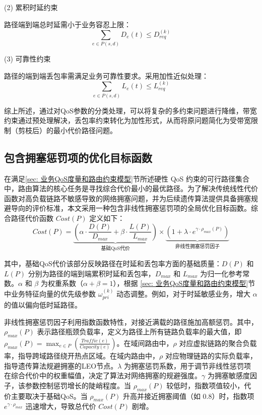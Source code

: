 \documentclass[print, master, vlined]{DissertUESTC}
\begin{document}
    (2) 累积时延约束
    
    路径端到端总时延需小于业务容忍上限：
    \begin{equation}
        \sum_{e \in P(s,d)} D_e(t) \le D_{req}^{(k)}
    \end{equation}
    
    (3) 可靠性约束
    
    路径的端到端丢包率需满足业务可靠性要求。采用加性近似处理：
    \begin{equation}
        \sum_{e \in P(s,d)} L_e(t) \le L_{req}^{(k)}
    \end{equation}
    
    综上所述，通过对QoS参数的分类处理，可以将复杂的多约束问题进行降维，带宽约束通过预处理解决，丢包率约束转化为加性形式，从而将原问题简化为受带宽限制（剪枝后）的最小代价路径问题。

    \subsection{包含拥塞惩罚项的优化目标函数}
    
    在满足\ref{sec: 业务QoS度量和路由约束模型}节所述硬性 QoS 约束的可行路径集合中，路由算法的核心任务是寻找综合代价最小的最优路径。为了解决传统线性代价函数对高负载链路不敏感导致的网络拥塞问题，并为后续遗传算法提供具备拥塞规避导向的评价标准，本文采用一种包含非线性拥塞惩罚项的全局优化目标函数。综合路径代价函数 $Cost(P)$ 定义如下：
    \begin{equation}
        Cost(P) = \underbrace{ \left( \alpha \cdot \frac{D(P)}{D_{max}} + \beta \cdot \frac{L(P)}{L_{max}} \right) }_{\text{基础QoS代价}} \times \underbrace{ \left( 1 + \lambda \cdot e^{\gamma \cdot \rho_{max}(P)} \right) }_{\text{非线性拥塞惩罚因子}}
    \end{equation}
    
    其中，基础QoS代价该部分反映路径在时延和丢包率方面的基础质量：$D(P)$ 和 $L(P)$ 分别为路径的端到端累积时延和丢包率，$D_{max}$ 和 $L_{max}$ 为归一化参考常数。$\alpha$ 和 $\beta$ 为权重系数（$\alpha + \beta = 1$），根据 \ref{sec: 业务QoS度量和路由约束模型}节中业务特征向量的优先级参数 $\omega_{pri}^{(k)}$ 动态调整。例如，对于时延敏感业务，增大 $\alpha$ 的值以偏向低时延路径。
    
    
    非线性拥塞惩罚因子利用指数函数特性，对接近满载的路径施加高额惩罚。其中，$\rho_{max}(P)$ 表示路径瓶颈负载率，定义为路径上所有链路负载率的最大值，即 $\rho_{max}(P) = \max_{e \in P} (\frac{Traffic(e)}{Capacity(e)})$。在域间路由中，$\rho$ 对应虚拟链路的聚合负载率，指导跨域路径绕开热点区域。在域内路由中，$\rho$ 对应物理链路的实际负载率，指导遗传算法规避拥塞的LEO节点。$\lambda$ 为拥塞惩罚系数，用于调节非线性惩罚项在综合代价中的权重幅值，决定了算法对网络拥塞的规避强度。$\gamma$ 为拥塞敏感度因子，该参数控制惩罚增长的陡峭程度。当 $\rho_{max}(P)$ 较低时，指数项值较小，代价主要取决于基础QoS。当 $\rho_{max}(P)$ 升高并接近拥塞阈值（如 0.8）时，指数项 $e^{\gamma \cdot \rho_{max}}$ 迅速增大，导致总代价 $Cost(P)$ 剧增。
    
\end{document}
